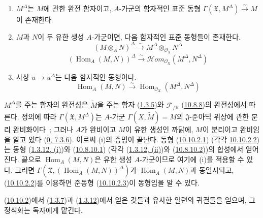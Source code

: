 \begin{proposition}[10.10.2]
\label{I.10.10.2-ko}
\medskip\noindent
\begin{enumerate}
  \item[\rm{(i)}] $M^\Delta$는 $M$에 관한 완전 함자이고, $A$-가군의
    함자적인 표준 동형
    $\Gamma(\mathfrak{X},M^\Delta)\xrightarrow{\sim}M$이 존재한다.
  \item[\rm{(ii)}] $M$과 $N$이 두 유한 생성 $A$-가군이면, 다음
    함자적인 표준 동형들이 존재한다.
    \[
      (M\otimes_A N)^\Delta
      \xrightarrow{\sim}
      M^\Delta\otimes_{\mathscr{O}_{\mathfrak{X}}}N^\Delta
      \tag{10.10.2.1}\label{I.10.10.2.1-ko}
    \]
    \[
      (\operatorname{Hom}_A(M,N))^\Delta
      \xrightarrow{\sim}
      \mathscr{H}\!om_{\mathscr{O}_{\mathfrak{X}}}
      (M^\Delta,N^\Delta)
      \tag{10.10.2.2}\label{I.10.10.2.2-ko}
    \]
  \item[\rm{(iii)}] 사상 $u\to u^\Delta$는 다음 함자적인 동형이다.
    \[
      \operatorname{Hom}_A(M,N)
      \xrightarrow{\sim}
      \operatorname{Hom}_{\mathscr{O}_{\mathfrak{X}}}
      (M^\Delta,N^\Delta)
      \tag{10.10.2.3}\label{I.10.10.2.3-ko}
    \]
\end{enumerate}
\end{proposition}

$M^\Delta$를 주는 함자의 완전성은 $\widetilde M$을 주는 함자
(\hyperref[I.1.3.5-ko]{1.3.5})와 $\mathscr{F}_{/\mathfrak{X}}$
(\hyperref[I.10.8.8-ko]{10.8.8})의 완전성에서 따른다. 정의에 따라
$\Gamma(\mathfrak{X},M^\Delta)$는 $A$-가군
$\Gamma(X,\widetilde M)=M$의 $\mathfrak{J}$-준아딕 위상에 관한 분리
완비화이다~; 그러나 $A$가 완비이고 $M$이 유한 생성인 까닭에,
$M$이 분리이고 완비임을 알고 있다
(\hyperref[0.7.3.6-ko]{0, 7.3.6}). 이로써 (i)의 증명이 끝난다. 동형
(\hyperref[I.10.10.2.1-ko]{10.10.2.1}) (각각
\hyperref[I.10.10.2.2-ko]{10.10.2.2})는 동형
(\hyperref[I.1.3.12-ko]{1.3.12, (i)})와
(\hyperref[I.10.8.10.1-ko]{10.8.10.1}) (각각
(\hyperref[I.1.3.12-ko]{1.3.12, (ii)})와
(\hyperref[I.10.8.10.2-ko]{10.8.10.2}))의 합성에서 얻어진다. 끝으로
$\operatorname{Hom}_A(M,N)$은 유한 생성 $A$-가군이므로 여기에 (i)를
적용할 수 있다. 그러면
$\Gamma(\mathfrak{X},(\operatorname{Hom}_A(M,N))^\Delta)$가
$\operatorname{Hom}_A(M,N)$과 동일시되고,
(\hyperref[I.10.10.2.2-ko]{10.10.2.2})를 이용하면 준동형
(\hyperref[I.10.10.2.3-ko]{10.10.2.3})이 동형임을 알 수 있다.

(\hyperref[I.10.10.2-ko]{10.10.2})에서
(\hyperref[I.1.3.7-ko]{1.3.7})과
(\hyperref[I.1.3.12-ko]{1.3.12})에서 얻은 것들과 유사한 일련의
귀결들을 얻으며, 그 정식화는 독자에게 맡긴다.

